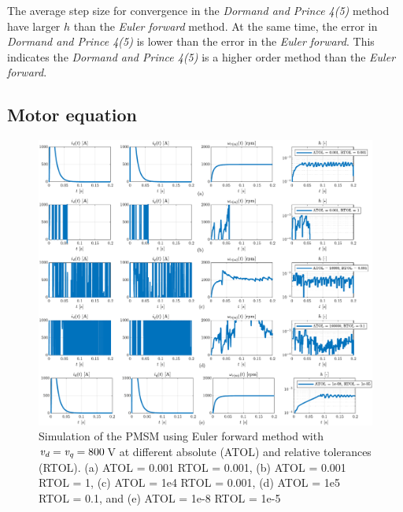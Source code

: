 The average step size for convergence in the \textit{Dormand and Prince 4(5)} method have larger $h$ than the \textit{Euler forward} method. At the same time, the error in \textit{Dormand and Prince 4(5)} is lower than the error in the \textit{Euler forward}. This indicates the \textit{Dormand and Prince 4(5)} is a higher order method than the \textit{Euler forward}. 

\subsection{Motor equation}
\begin{figure}[t!b!]
	\centering
	\includegraphics[width=\textwidth]{Figures/ef_MotorCase_ode45_Atol_Rtol.pdf}
	\caption{Simulation of the PMSM using Euler forward method with $\textit{v\textsubscript{d}}=\textit{v\textsubscript{q}}=800\,$V at different absolute (ATOL) and relative tolerances (RTOL). (a) ATOL = 0.001 RTOL = 0.001, (b) ATOL = 0.001 RTOL = 1, (c) ATOL = 1e4 RTOL = 0.001, (d) ATOL = 1e5 RTOL = 0.1, and (e) ATOL = 1e-8 RTOL = 1e-5}
	\label{fig:EMresOde45}
\end{figure}
